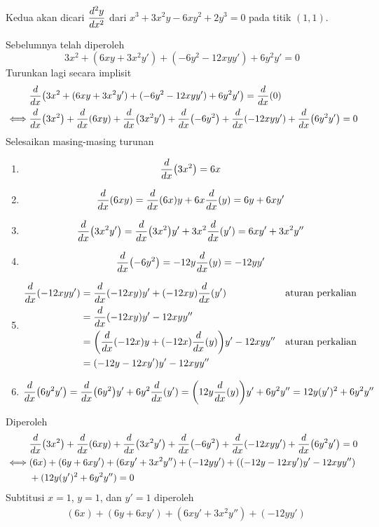 \begin{enumerate}[leftmargin=*, label={\arabic*}.]
\begin{enumerate}[label={\alph*}.]
    Kedua akan dicari $\displaystyle\frac{d^{2}y}{dx^{2}}$ dari 
    $x^{3}+3x^{2}y-6xy^{2}+2y^{3}=0$ pada titik $(1,1)$.

    Sebelumnya telah diperoleh
    \[
        3x^{2}+(6xy+3x^{2}y')+(-6y^2-12xyy')+6y^{2}y'=0
    \]
    Turunkan lagi secara implisit
    \begin{align*}
        &\drv{x}{3x^{2}+(6xy+3x^{2}y')+(-6y^2-12xyy')+6y^{2}y'} = \drv{x}{0}\\
        \iff &\drv{x}{3x^{2}}+\drv{x}{6xy}+\drv{x}{3x^{2}y'}
        +\drv{x}{-6y^{2}}+\drv{x}{-12xyy'}+\drv{x}{6y^{2}y'}=0
    \end{align*}
    Selesaikan masing-masing turunan
    \begin{enumerate}[label={\arabic*})]
    \item \[
        \drv{x}{3x^{2}} = 6x
    \]
    \item \[
        \drv{x}{6xy} = \drv{x}{6x}y + 6x\drv{x}{y} = 6y+6xy'
    \]
    \item \[
        \drv{x}{3x^{2}y'} = \drv{x}{3x^{2}}y' + 3x^{2}\drv{x}{y'} = 6xy'+3x^{2}y''
    \]
    \item \[
        \drv{x}{-6y^{2}} = -12y\drv{x}{y} = -12yy'
    \]
    \item \begin{align*}
        \drv{x}{-12xyy'} &= \drv{x}{-12xy}y'+(-12xy)\drv{x}{y'}
        &\text{aturan perkalian}\\
        &=\drv{x}{-12xy}y'-12xyy''\\
        &=\brk*{\drv{x}{-12x}y+(-12x)\drv{x}{y}}y'-12xyy''
        &\text{aturan perkalian}\\
        &=(-12y-12xy')y'-12xyy''
    \end{align*}
    \item \[
        \drv{x}{6y^{2}y'} = \drv{x}{6y^{2}}y' + 6y^{2}\drv{x}{y'} 
        =\brk*{12y\drv{x}{y}}y'+6y^{2}y''=12y(y')^{2}+6y^{2}y''
    \]
    \end{enumerate}
    Diperoleh
    \begin{align*}
        &\drv{x}{3x^{2}}+\drv{x}{6xy}+\drv{x}{3x^{2}y'}
        +\drv{x}{-6y^{2}}+\drv{x}{-12xyy'}+\drv{x}{6y^{2}y'}=0\\
        \iff &(6x)+(6y+6xy')+(6xy'+3x^{2}y'')+(-12yy')
        +\brk*{(-12y-12xy')y'-12xyy''}\\
        &+(12y(y')^{2}+6y^{2}y'')=0
    \end{align*}
    Subtitusi $x=1$, $y=1$, dan $y'=1$ diperoleh
    \begin{align*}
        &(6x)+(6y+6xy')+(6xy'+3x^{2}y'')+(-12yy')

\end{align*}
\end{enumerate}
\end{enumerate}
